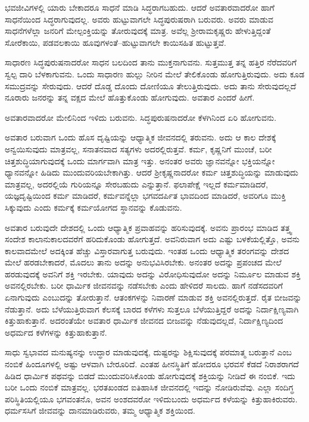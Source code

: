 ಭವಜೀವಿಗಳಲ್ಲಿ ಯಾರು ಬೇಕಾದರೂ ಸಾಧನೆ ಮಾಡಿ ಸಿದ್ಧರಾಗಬಹುದು. ಆದರೆ ಅವತಾರವಾದರೋ ಹಾಗೆ ಸಾಧನೆಯಿಂದ ಸಿದ್ಧರಾಗುವುದಲ್ಲ. ಅವರು ಹುಟ್ಟುವಾಗಲೇ ಸಿದ್ಧ\-ಪುರುಷರಾಗಿ ಬರುವರು. ಅವರು ಮಾಡುವ ಸಾಧನೆಗಳೆಲ್ಲಾ ಜನರಿಗೆ ಮೇಲ್ಪಂಕ್ತಿಯನ್ನು ತೋರುವುದಕ್ಕೆ ಮಾತ್ರ. ಅವೆಲ್ಲ ಶ‍್ರೀರಾಮಕೃಷ್ಣರು ಹೇಳುತ್ತಿದ್ದಂತೆ ಸೋರೆಕಾಯಿ, ಪಡವಲಕಾಯಿ ಹೂವುಗಳಂತೆ–ಹುಟ್ಟುವಾಗಲೇ ಕಾಯಿಸಹಿತ ಹುಟ್ಟುತ್ತವೆ.

ಸಾಧಾರಣ ಸಿದ್ಧಪುರುಷನಾದರೋ ಸಾಧನ ಬಲದಿಂದ ತಾನು ಮುಕ್ತನಾಗುವನು. ಸುತ್ತಮುತ್ತ ತನ್ನ ಹತ್ತಿರ ನೆರೆದವರಿಗೆ ಸ್ವಲ್ಪ ದಾರಿ ಬೆಳಕಾಗುವನು. ಒಂದು ಸಾಧಾರಣ ಹುಲ್ಲು ನೀರಿನ ಮೇಲೆ ತೇಲಿಕೊಂಡು ಹೋಗುತ್ತಿರುವುದು. ಅದು ಕೂಡ ಸಮುದ್ರವನ್ನು ಸೇರುವುದು. ಆದರೆ ದೊಡ್ಡ ದೊಂದು ದೋಣಿಯೂ ತೇಲುತ್ತಿರುವುದು. ಅದು ತಾನು ಸೇರುವುದಲ್ಲದೆ ನೂರಾರು ಜನರನ್ನು ತನ್ನ ವಕ್ಷದ ಮೇಲೆ ಹೊತ್ತುಕೊಂಡು ಹೋಗುವುದು. ಅವತಾರ ಎಂದರೆ ಹೀಗೆ.

ಅವತಾರವಾದರೋ ಮೇಲಿನಿಂದ ಇಳಿದು ಬರುವನು. ಸಿದ್ಧಪುರುಷನಾದರೋ ಕೆಳಗಿನಿಂದ ಏರಿ ಹೋಗುವನು.

ಅವತಾರ ಬರುವಾಗ ಒಂದು ಹೊಸ ದೃಷ್ಟಿಯನ್ನು ಆಧ್ಯಾತ್ಮಿಕ ಜೀವನದಲ್ಲಿ ತರುವನು. ಅದು ಆ ಕಾಲ ದೇಶಕ್ಕೆ ಅನ್ವಯಿಸುವುದು ಮಾತ್ರವಲ್ಲ, ಸನಾತನವಾದ ಸತ್ಯಗಳು ಅದರಲ್ಲಿರುತ್ತವೆ. ಕರ್ಮ, ಕೃಷ್ಣನಿಗೆ ಮುಂಚೆ, ಬರೀ ಚಿತ್ತಶುದ್ಧಿಯಾಗುವುದಕ್ಕೆ ಒಂದು ಮಾರ್ಗವಾಗಿ ಮಾತ್ರ ಇತ್ತು. ಅನಂತರ ಅವರು ಜ್ಞಾನವನ್ನೋ ಭಕ್ತಿಯನ್ನೋ ಧ್ಯಾನವನ್ನೋ ಹಿಡಿದು ಮುಂದುವರಿಯ\-ಬೇಕಾಗಿತ್ತು. ಆದರೆ ಶ‍್ರೀಕೃಷ್ಣನಾದರೋ ಕರ್ಮ ಚಿತ್ತಶುದ್ಧಿಯನ್ನು ಮಾಡುವುದು ಮಾತ್ರವಲ್ಲ, ಅದರಲ್ಲಿಯೆ ಗುರಿಯನ್ನೂ ಸೇರಬಹುದು ಎನ್ನುತ್ತಾನೆ. ಫಲಾಪೇಕ್ಷೆ ಇಲ್ಲದೆ ಕರ್ಮಮಾಡಿದರೆ, ಯಜ್ಞದೃಷ್ಟಿಯಿಂದ ಕರ್ಮ ಮಾಡಿದರೆ, ಕರ್ಮವನ್ನೆಲ್ಲಾ ಭಗವದರ್ಪಿತ ಭಾವದಿಂದ ಮಾಡಿದರೆ, ಅವರಿಗೂ ಮುಕ್ತಿ ಸಿಕ್ಕುವುದು ಎಂದು ಕರ್ಮಕ್ಕೆ ಕರ್ಮಯೋಗದ ಸ್ಥಾನವನ್ನು ಕೊಡುವನು.

ಅವತಾರ ಬರುವುದೇ ದೇಶದಲ್ಲಿ ಒಂದು ಆಧ್ಯಾತ್ಮಿಕ ಪ್ರವಾಹವನ್ನು ಹರಿಸುವುದಕ್ಕೆ. ಅವನು ಪ್ರಾರಂಭ ಮಾಡಿದ ತತ್ತ್ವ ಸಂದೇಶ ಕಾಲಾನುಕಾಲದವರೆಗೆ ಹರಿದುಕೊಂಡು ಹೋಗುತ್ತದೆ. ಅವನಿರುವಾಗ ಅದು ಎಷ್ಟು ಬಳಕೆಯಲ್ಲಿತ್ತೊ, ಅವನು ಕಾಲವಾದಮೇಲೆ ಅದಕ್ಕಿಂತ ಹೆಚ್ಚು ವಿಸ್ತಾರವಾಗುತ್ತ ಬರುವುದು. ಇಂತಹ ಒಂದು ಆಧ್ಯಾತ್ಮಿಕ ತರಂಗವನ್ನು ದೇಶದ ಮೇಲೆ ಹರಡ\-ಬೇಕಾದರೆ, ಮೊದಲು ತಾನು ಅದನ್ನು ಅನುಭವಿಸಿರಬೇಕು. ಅನಂತರ ಅದನ್ನು ಪ್ರಪಂಚದ ಮೇಲೆ ಹರಡುವುದಕ್ಕೆ ಅವನಿಗೆ ಶಕ್ತಿ ಇರಬೇಕು. ಯಾವುದು ಅದನ್ನು ವಿರೋಧಿಸುವುದೋ ಅದನ್ನು ನಿರ್ಮೂಲ ಮಾಡುವ ಶಕ್ತಿ ಅವನಲ್ಲಿರಬೇಕು. ಬರೀ ಧಾರ್ಮಿಕ ಜೀವನವನ್ನು ನಡೆಸಬೇಕು ಎಂದು ಹೇಳಿದರೆ ಸಾಲದು. ಹಾಗೆ ನಡೆಸದವರಿಗೆ ಏನಾಗುವುದು ಎಂಬುದನ್ನು ತೋರುತ್ತಾನೆ. ಆತಂಕಗಳನ್ನು ನಿವಾರಣೆ ಮಾಡುವ ಶಕ್ತಿ ಅವನಲ್ಲಿರುತ್ತದೆ. ರೈತ ಬೀಜವನ್ನು ನೆಡುತ್ತಾನೆ. ಅದು ಬೆಳೆಯುತ್ತಿರುವಾಗ ಕೆಲಸಕ್ಕೆ ಬಾರದ ಕಳೆಗಳು ಸುತ್ತಲೂ ಬೆಳೆಯುತ್ತಿದ್ದರೆ ಅದನ್ನು ನಿರ್ದಾಕ್ಷಿಣ್ಯವಾಗಿ ಕಿತ್ತುಹಾಕುತ್ತಾನೆ. ಅದರಂತೆಯೇ ಅವತಾರ ಧಾರ್ಮಿಕ ಜೀವನದ ಬೀಜವನ್ನು ನೆಡುವುದಲ್ಲದೆ, ನಿರ್ದಾಕ್ಷಿಣ್ಯದಿಂದ ಅಧರ್ಮದ ಕಳೆಗಳನ್ನು ಕಿತ್ತುಹಾಕುತ್ತಾನೆ.

ಸಾಧು ಸ್ವಭಾವದ ಮನುಷ್ಯನನ್ನು ಉದ್ಧಾರ ಮಾಡುವುದಕ್ಕೆ, ದುಷ್ಟರನ್ನು ಶಿಕ್ಷಿಸುವುದಕ್ಕೆ ಪರಮಾತ್ಮ ಬರುತ್ತಾನೆ ಎಂಬ ನಂಬಿಕೆ ಹಿಂದೂಗಳಲ್ಲಿ ಅಷ್ಟು ಆಳವಾಗಿ ಬೇರೂರಿದೆ. ಎಂತಹ ಹೀನಸ್ಥಿತಿಗೆ ಹೋದರೂ ಭರವಸೆ ಕೆಡದೆ ನಿರಾಶರಾಗದೆ ಹಿಡಿದ ಧಾರ್ಮಿಕ ಪಥವನ್ನು ಬಿಡದೆ ಮುಂದುವರಿಸಿಕೊಂಡು ಹೋಗುವುದಕ್ಕೆ ಶಕ್ತಿಯನ್ನು ನೀಡಿದೆ ಈ ನಂಬಿಕೆ. ಇದು ಬರೀ ಒಂದು ನಂಬಿಕೆ ಮಾತ್ರವಲ್ಲ. ಭರತಖಂಡದ ಐತಿಹಾಸಿಕ ಜೀವನದಲ್ಲಿ ಇದನ್ನು ನೋಡಿರುವೆವು. ಎಲ್ಲಾ ಸಂದಿಗ್ಧ ಪರಿಸ್ಥಿತಿಯಲ್ಲಿಯೂ ಭಗವಂತನೊ, ಅವನ ಅಂಶದವರೋ ಇಳಿದುಬಂದು ಅಧರ್ಮದ ಕಳೆಯನ್ನು ಕಿತ್ತುಹಾಕಿರುವರು. ಧರ್ಮಸಸಿಗೆ ಜೀವವನ್ನು ದಾನಮಾಡಿರುವರು, ತಮ್ಮ ಆಧ್ಯಾತ್ಮಿಕ ಶಕ್ತಿಯಿಂದ.

